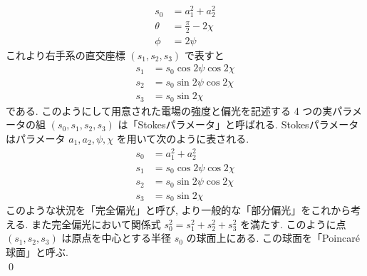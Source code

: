 \documentclass[uplatex,dvipdfmx,a4paper,11pt]{jlreq}
\makeatletter
\theoremstyle{definition}
\renewenvironment{proof}[1][\proofname]{\par
  \normalfont
  \topsep6\p@\@plus6\p@ \trivlist
  \item[\hskip\labelsep{\bfseries #1}\@addpunct{\bfseries}]\ignorespaces\quad\par
}{%
  \qed\endtrivlist\@endpefalse
}
\renewcommand\proofname{証明}
\makeatother
\begin{document}
\begin{proof}
  \begin{align}
    s_0    & = a_1^2 + a_2^2         \\
    \theta & = \frac{\pi}{2} - 2\chi \\
    \phi   & = 2\psi
  \end{align}
  これより右手系の直交座標 $(s_1, s_2, s_3)$ で表すと
  \begin{align}
    s_1 & = s_0\cos2\psi\cos2\chi \\
    s_2 & = s_0\sin2\psi\cos2\chi \\
    s_3 & = s_0\sin2\chi
  \end{align}
  である. このようにして用意された電場の強度と偏光を記述する 4 つの実パラメータの組 $(s_0, s_1, s_2, s_3)$ は「Stokesパラメータ」と呼ばれる. Stokesパラメータはパラメータ $a_1, a_2, \psi, \chi$ を用いて次のように表される.
  \begin{align}
    s_0 & = a_1^2 + a_2^2                        \\
    s_1 & = s_0\cos2\psi\cos2\chi \label{s1 def} \\
    s_2 & = s_0\sin2\psi\cos2\chi \label{s2 def} \\
    s_3 & = s_0\sin2\chi \label{s3 def}
  \end{align}
  このような状況を「完全偏光」と呼び, より一般的な「部分偏光」をこれから考える. また完全偏光において関係式 $s_0^2 = s_1^2 + s_2^2 + s_3^2$ を満たす. このように点 $(s_1, s_2, s_3)$ は原点を中心とする半径 $s_0$ の球面上にある. この球面を「Poincaré 球面」と呼ぶ. \\
\end{proof}
\end{document}
